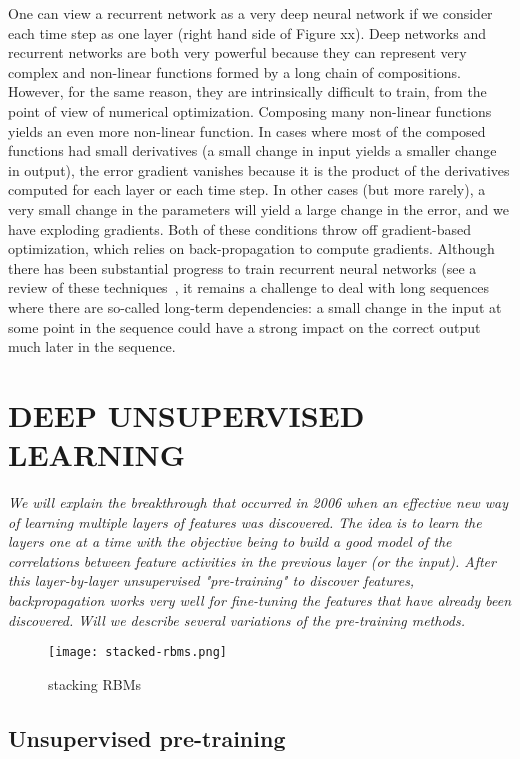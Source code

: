 \documentclass[11pt]{article} %
\begin{document}
One can view a recurrent network as a very deep neural network if we
consider each time step as one layer (right hand side of Figure xx). Deep
networks and recurrent networks are both very powerful because they can
represent very complex and non-linear functions formed by a long chain of
compositions. However, for the same reason, they are intrinsically
difficult to train, from the point of view of numerical
optimization. Composing many non-linear functions yields an even more
non-linear function. In cases where most of the composed functions had
small derivatives (a small change in input yields a smaller change in
output), the error gradient vanishes because it is the product of the
derivatives computed for each layer or each time step. In other cases (but
more rarely), a very small change in the parameters will yield a large
change in the error, and we have exploding gradients. Both of these
conditions throw off gradient-based optimization, which relies on
back-propagation to compute gradients. Although there has been substantial
progress to train recurrent neural networks (see a review of these
techniques~\citep{Pascanu+al-ICML2013-small}, it remains a challenge to deal with long
sequences where there are so-called long-term dependencies: a small change
in the input at some point in the sequence could have a strong impact on
the correct output much later in the sequence.


\section{DEEP UNSUPERVISED LEARNING}

{\em
We will explain the breakthrough that occurred in 2006 when an effective
 new way of learning multiple layers of features was discovered. The idea
 is to learn the layers one at a time with the objective being to build a good
 model of the correlations between feature activities in the previous layer
 (or the input).  After this layer-by-layer unsupervised "pre-training" to
 discover features, backpropagation works very well for fine-tuning the
 features that have already been discovered.  Will we describe several
 variations of the pre-training methods.
}

\begin{figure}[H]
\centerline{\texttt{[image: stacked-rbms.png]}}
\caption{stacking RBMs}
\end{figure}

\subsection{Unsupervised pre-training}
\end{document}
